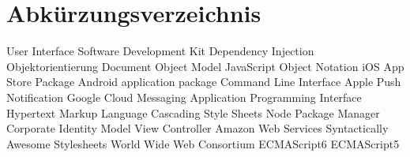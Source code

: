 
\chapter*{Abkürzungsverzeichnis}

\begin{acronym}
  {User Interface}
  {Software Development Kit}
  {Dependency Injection}
   {Objektorientierung}
   {Document Object Model}
   {JavaScript Object Notation}
   {iOS App Store Package}
   {Android application package}
   {Command Line Interface}
   {Apple Push Notification}
   {Google Cloud Messaging}
   {Application Programming Interface}
   {Hypertext Markup Language}
   {Cascading Style Sheets}
   {Node Package Manager}
   {Corporate Identity}
   {Model View Controller}
   {Amazon Web Services}
   {Syntactically Awesome Stylesheets}
   {World Wide Web Consortium}
   {ECMAScript6}
   {ECMAScript5}
\end{acronym}
